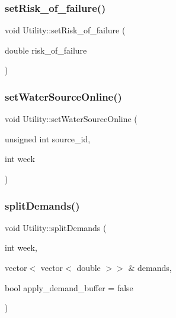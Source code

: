 \mbox{\label{classUtility_a68d5088951f6bdccbb7af18ea8f153f5_a68d5088951f6bdccbb7af18ea8f153f5}} 
\subsubsection{\texorpdfstring{set\+Risk\+\_\+of\+\_\+failure()}{setRisk\_of\_failure()}}
{\footnotesize\ttfamily void Utility\+::set\+Risk\+\_\+of\+\_\+failure (\begin{DoxyParamCaption}\item[{double}]{risk\+\_\+of\+\_\+failure }\end{DoxyParamCaption})}

\mbox{\label{classUtility_ae01127adf3c99415310e77b22bd9f3b5_ae01127adf3c99415310e77b22bd9f3b5}} 
\subsubsection{\texorpdfstring{set\+Water\+Source\+Online()}{setWaterSourceOnline()}}
{\footnotesize\ttfamily void Utility\+::set\+Water\+Source\+Online (\begin{DoxyParamCaption}\item[{unsigned int}]{source\+\_\+id,  }\item[{int}]{week }\end{DoxyParamCaption})}

\mbox{\label{classUtility_ab578bbe9f346692d9251418f20fd2345_ab578bbe9f346692d9251418f20fd2345}} 
\subsubsection{\texorpdfstring{split\+Demands()}{splitDemands()}}
{\footnotesize\ttfamily void Utility\+::split\+Demands (\begin{DoxyParamCaption}\item[{int}]{week,  }\item[{vector$<$ vector$<$ double $>$$>$ \&}]{demands,  }\item[{bool}]{apply\+\_\+demand\+\_\+buffer = {\ttfamily false} }\end{DoxyParamCaption})}

